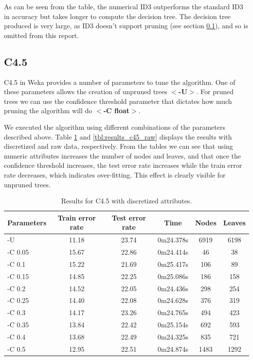 \documentclass[a4paper]{llncs}
\begin{document}
As can be seen from the table, the numerical ID3 outperforms the standard ID3 in
accuracy but takes longer to compute the decision tree. The decision tree
produced is very large, as ID3 doesn't support pruning (see section 
\ref{sec:c4.5}), and so is omitted from this report.

\subsection{C4.5}
\label{sec:c4.5}

C4.5 in Weka provides a number of parameters to tune the algorithm.
One of these parameters allows the creation of unpruned trees $<$\textbf{-U}$>$.
For pruned trees we can use the confidence threshold parameter that dictates how
much pruning the algorithm will do $<$\textbf{-C float}$>$.

We executed the algorithm using different combinations of the parameters described above.
Table \ref{tbl:results_c45_discr} and \ref{tbl:results_c45_raw} displays the results
with discretized and raw data, respectively. From the tables we can see that
using numeric attributes increases the number of nodes and leaves, and
that once the confidence threshold increases, the test error rate
increases while the train error rate decreases, which indicates over-fitting.
This effect is clearly visible for unpruned trees.

\begin{table}[ht]
  \begin{center}
  \begin{tabular}{ | l | c | c | c | c | c |}
    \hline
    \textbf{Parameters} & \textbf{Train error rate} & \textbf{Test error rate} & \textbf{Time} & \textbf{Nodes} & \textbf{Leaves} \\ \hline
    -U & 11.18 & 23.74 & 0m24.378s & 6919 & 6198 \\ \hline
    -C 0.05 & 15.67 & 22.86 & 0m24.414s & 46 & 38 \\ \hline
    -C 0.1 & 15.22 & 21.69 & 0m25.417s & 106 & 89 \\ \hline
    -C 0.15 & 14.85 & 22.25 & 0m25.086s & 186 & 158 \\ \hline
    -C 0.2 & 14.52 & 22.05 & 0m24.436s & 298 & 254 \\ \hline
    -C 0.25 & 14.40 & 22.08 & 0m24.628s & 376 & 319 \\ \hline
    -C 0.3 & 14.17 & 23.26 & 0m24.765s & 494 & 423 \\ \hline
    -C 0.35 & 13.84 & 22.42 & 0m25.154s & 692 & 593 \\ \hline
    -C 0.4 & 13.68 & 22.49 & 0m24.325s & 835 & 721 \\ \hline
    -C 0.5 & 12.95 & 22.51 & 0m24.874s & 1483 & 1292 \\ \hline
  \end{tabular}
  \caption{Results for C4.5 with discretized attributes.}
  \label{tbl:results_c45_discr}
  \end{center}
\end{table}
\end{document}
